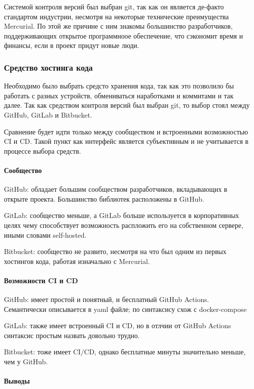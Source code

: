 Системой контроля версий был выбран git, так как он является де-факто стандартом индустрии, несмотря на некоторые технические преимущества Mercurial.
По этой же причине с ним знакомы большинство разработчиков, поддерживающих открытое программноое обеспечение, что сэкономит время и финансы, если в проект
придут новые люди.

\subsubsection{Средство хостинга кода}

Необходимо было выбрать средсто хранения кода, так как это позволило бы работать с разных устройств, обмениваться наработками и коммитами и так далее.
Так как средством контроля версий был выбран git, то выбор стоял между GitHub, GitLab и Bitbucket.

Сравнение будет идти только между сообществом и встроенными возможностью CI и CD. Такой пункт как интерфейс является субъективным и не учитывается
в процессе выбора средств.

\paragraph{Сообщество}

GitHub: обладает большим сообществом разработчиков, вкладывающих в открыте проекта. Большинство библиотек расположены в GitHub.

GitLab: сообщество меньше, а GitLab больше используется в корпоративных целях чему способствует возможность распложить его на собственном сервере, иными словами
self-hosted.

Bitbucket: сообщество не развито, несмотря на что был одним из первых хостингов кода, работая изначально с Mercurial.

\paragraph{Возможности CI и CD}

GitHub: имеет простой и понятный, и бесплатный GitHub Actions. Семантически описывается в yaml файле; по синтаксису схож с docker-compose

GitLab: также имеет встроенный CI и CD, но в отлчии от GitHub Actions синтаксис простым назвать довольно трудно.

Bitbucket: тоже имеет CI/CD, однако бесплатные минуты значительно меньше, чем у GitHub.

\paragraph{Выводы}

